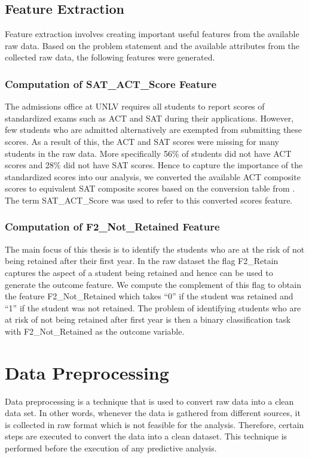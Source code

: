 \documentclass[11pt,openright]{report}
\begin{document}
\subsection{Feature Extraction}
Feature extraction involves creating important useful features from the available raw data. Based on the problem statement and the available attributes from the collected raw data, the following features were generated.

\subsubsection {Computation of SAT\_ACT\_Score Feature}
The admissions office at UNLV requires all students to report scores of standardized exams such as ACT and SAT during their applications. However, few students who are admitted alternatively are exempted from submitting these scores. As a result of this, the ACT and SAT scores were missing for many students in the raw data. More specifically 56\% of students did not have ACT scores and 28\% did not have SAT scores. Hence to capture the importance of the standardized scores into our analysis, we converted the available ACT composite scores to equivalent 
SAT composite scores based on the conversion table from \cite{ACTSAT}. The term SAT\_ACT\_Score was used to refer to this converted scores feature.

\subsubsection {Computation of F2\_Not\_Retained Feature}
The main focus of this thesis is to identify the students who are at the risk of not being retained after their first year. In the raw dataset the flag F2\_Retain captures the aspect of a student being retained and hence can be used to generate the outcome feature. We compute the complement of this flag to obtain the feature F2\_Not\_Retained which takes ``0'' if the student was retained and ``1'' if the student was not retained. The problem of identifying students who are at risk of not being retained after first year is then a binary classification task with F2\_Not\_Retained as the outcome variable.

\section {Data Preprocessing}
Data preprocessing is a technique that is used to convert raw data into a clean data set. In other words, whenever the data is gathered from different sources, it is collected in raw format which is not feasible for the analysis.
Therefore, certain steps are executed to convert the data into a clean dataset. This technique is performed before the execution of any predictive analysis. 
\end{document}
